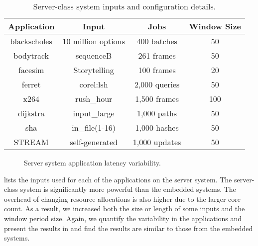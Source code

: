 \begin{table}[t]
\small
\centering
\caption{Server-class system inputs and configuration details.}
\begin{tabular}{cccc}
  \textbf{Application} & \textbf{Input} & \textbf{Jobs} & \textbf{Window Size} \\
  \hline
  \hline
  blackscholes   & 10 million options             & 400 batches   & 50 \\
  bodytrack      & sequenceB                      & 261 frames    & 50 \\
  facesim        & Storytelling                   & 100 frames    & 20 \\
  ferret         & corel:lsh                      & 2,000 queries & 50 \\
  x264           & rush\_hour                     & 1,500 frames  & 100 \\
  dijkstra       & input\_large                   & 1,000 paths   & 50 \\
  sha            & in\_file(1-16)                 & 1,000 hashes  & 50 \\
  STREAM         & self-generated                 & 1,000 updates & 50 \\
  \hline
  \hline
\end{tabular}
\label{tbl:poet-server-inputs}
\end{table}

\begin{figure}[t]
  
  \caption{Server system application latency variability.}
  \label{fig:poet-server-variation}
\end{figure}

 lists the inputs used for each of the applications on the server system.
The server-class system is significantly more powerful than the embedded systems.
The overhead of changing resource allocations is also higher due to the larger core count.
As a result, we increased both the size or length of some inputs and the window period size.
Again, we quantify the variability in the applications and present the results in  and find the results are similar to those from the embedded systems.
